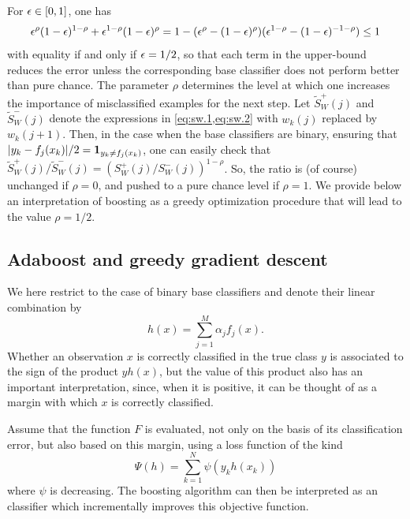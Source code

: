 For $\epsilon \in [0,1]$, one has
\[
\epsilon^\rho(1-\epsilon)^{1-\rho} + \epsilon^{1-\rho}(1-\epsilon)^{\rho} = 1 - (\epsilon^\rho - (1-\epsilon)^\rho)(\epsilon^{1-\rho} - (1-\epsilon)^{-1-\rho}) \leq 1
\]
with equality if and only if $\epsilon = 1/2$, so that each term in the upper-bound reduces the error unless the corresponding base classifier does not perform better than pure chance. The parameter $\rho$ determines the level at which one increases the importance of misclassified examples for the next step. Let $\tilde S_W^+(j)$ and $\tilde S^-_W(j)$ denote the expressions in \cref{eq:sw.1,eq:sw.2} with $w_k(j)$ replaced by $w_k(j+1)$. 
Then, in the case when the base classifiers are binary, ensuring that $|y_k - f_j(x_k)|/2 = {\bm 1}_{y_k\neq f_j(x_k)}$, one can easily check that $\tilde S_W^+(j)/\tilde S^-_W(j) = (S_W^+(j)/ S^-_W(j))^{1-\rho}$. So, the ratio is (of course) unchanged if $\rho = 0$, and pushed to a pure chance level if $\rho = 1$. 
We provide below an interpretation of boosting as a greedy optimization procedure that will lead to the value $\rho=1/2$.




\subsection{Adaboost and greedy gradient descent}
We here restrict to the case of binary base classifiers and denote their linear combination  by
\[
h(x) = \sum_{j=1}^M \alpha_j f_j(x).
\]
Whether an observation $x$ is correctly classified in the true class $y$ is associated to the sign of the product $yh(x)$, but the value of this product also has an
important interpretation, since, when it is positive, it can be thought of as a margin with which
$x$ is correctly classified. 

Assume that the function $F$ is evaluated, not only on the basis of
its classification error, but also based on this margin,
using a loss function of the kind
\begin{equation}
\label{eq:boosting.margin}
\Psi(h) = \sum_{k=1}^N \psi(y_kh(x_k))
\end{equation}
where $\psi$ is decreasing. The boosting algorithm can then be interpreted as an classifier which
incrementally improves this objective function.

